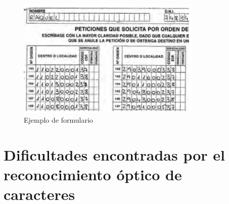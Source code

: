 \documentclass[10pt, a4paper]{article}
\begin{document}
\begin{itemize}
\begin{figure}[H] %
\begin{center}
\includegraphics[width=250pt]{../informe/imgs/ejemplo2_anteproyecto.png}
\caption[h]{Ejemplo de formulario}
\end{center}
\end{figure}

\end{itemize}

\section{Dificultades encontradas por el reconocimiento óptico de caracteres}
\end{document}
